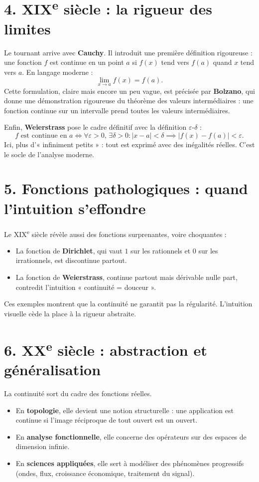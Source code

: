 \documentclass[12pt, a4paper]{article}
\begin{document}
\section*{4. XIX\textsuperscript{e} siècle : la rigueur des limites}
Le tournant arrive avec \textbf{Cauchy}. Il introduit une première définition rigoureuse : une fonction $f$ est continue en un point $a$ si $f(x)$ tend vers $f(a)$ quand $x$ tend vers $a$. En langage moderne :
\[
\lim_{x \to a} f(x) = f(a).
\]
Cette formulation, claire mais encore un peu vague, est précisée par \textbf{Bolzano}, qui donne une démonstration rigoureuse du théorème des valeurs intermédiaires : une fonction continue sur un intervalle prend toutes les valeurs intermédiaires.

Enfin, \textbf{Weierstrass} pose le cadre définitif avec la définition $\varepsilon$-$\delta$ :
\[
f \text{ est continue en } a \iff \forall \varepsilon > 0, \, \exists \delta > 0 : |x - a| < \delta \implies |f(x) - f(a)| < \varepsilon.
\]
Ici, plus d’« infiniment petits » : tout est exprimé avec des inégalités réelles. C’est le socle de l’analyse moderne.

\section*{5. Fonctions pathologiques : quand l’intuition s’effondre}
Le XIX\textsuperscript{e} siècle révèle aussi des fonctions surprenantes, voire choquantes :
\begin{itemize}
    \item La fonction de \textbf{Dirichlet}, qui vaut $1$ sur les rationnels et $0$ sur les irrationnels, est discontinue partout.
    \item La fonction de \textbf{Weierstrass}, continue partout mais dérivable nulle part, contredit l’intuition « continuité = douceur ».
\end{itemize}
Ces exemples montrent que la continuité ne garantit pas la régularité. L’intuition visuelle cède la place à la rigueur abstraite.

\section*{6. XX\textsuperscript{e} siècle : abstraction et généralisation}
La continuité sort du cadre des fonctions réelles.
\begin{itemize}
    \item En \textbf{topologie}, elle devient une notion structurelle : une application est continue si l’image réciproque de tout ouvert est un ouvert.
    \item En \textbf{analyse fonctionnelle}, elle concerne des opérateurs sur des espaces de dimension infinie.
    \item En \textbf{sciences appliquées}, elle sert à modéliser des phénomènes progressifs (ondes, flux, croissance économique, traitement du signal).
\end{itemize}
\end{document}
